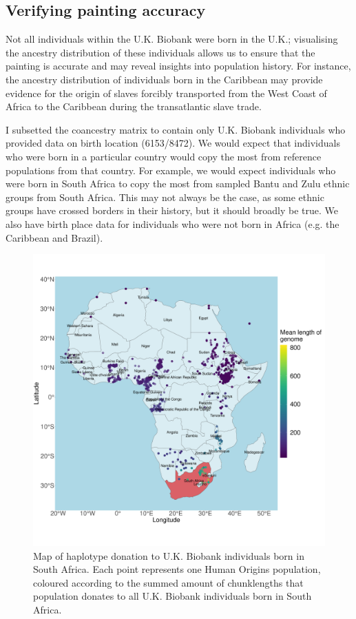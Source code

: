\subsection{Verifying painting accuracy} 
 
Not all individuals within the U.K. Biobank were born in the U.K.; visualising the ancestry distribution of these individuals allows us to ensure that the painting is accurate and may reveal insights into population history. For instance, the ancestry distribution of individuals born in the Caribbean may provide evidence for the origin of slaves forcibly transported from the West Coast of Africa to the Caribbean during the transatlantic slave trade. 

I subsetted the coancestry matrix to contain only U.K. Biobank individuals who provided data on birth location (6153/8472). We would expect that individuals who were born in a particular country would copy the most from reference populations from that country. For example, we would expect individuals who were born in South Africa to copy the most from sampled Bantu and Zulu ethnic groups from South Africa. This may not always be the case, as some ethnic groups have crossed borders in their history, but it should broadly be true. We also have birth place data for individuals who were not born in Africa (e.g. the Caribbean and Brazil). 

\begin{figure}[htp]
    \centering
    \includegraphics[width=1.0\textwidth]{../images/chapter3/haplotype_map_SouthAfrica.pdf}
    \caption{Map of haplotype donation to U.K. Biobank individuals born in South Africa. Each point represents one Human Origins population, coloured according to the summed amount of chunklengths that population donates to all U.K. Biobank individuals born in South Africa. }
    \label{fig:haplotype_map_SouthAfrica}
\end{figure}


